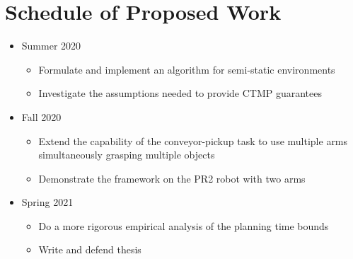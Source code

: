 \documentclass[a4paper]{report}
\begin{document}
\section{Schedule of Proposed Work}
\begin{itemize}
\item Summer 2020
	\begin{itemize}
	\item Formulate and implement an algorithm for semi-static environments
	\item Investigate the assumptions needed to provide CTMP guarantees
	\end{itemize}
\item Fall 2020
	\begin{itemize}
	\item Extend the capability of the conveyor-pickup task to use multiple arms simultaneously grasping multiple objects
	\item Demonstrate the framework on the PR2 robot with two arms
	\end{itemize}
\item Spring 2021
	\begin{itemize}
	\item Do a more rigorous empirical analysis of the planning time bounds
	\item Write and defend thesis
	\end{itemize}
\end{itemize}



\newpage



\end{document}
